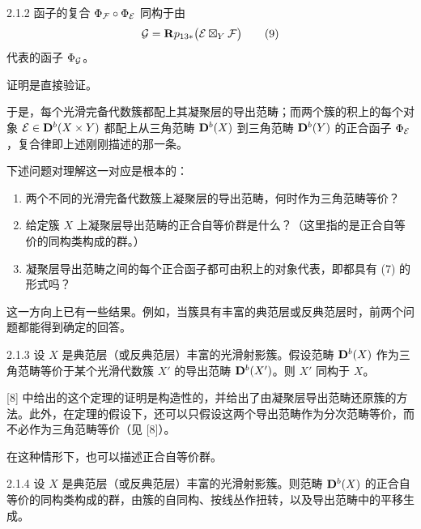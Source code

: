 \begin{proposition}{2.1.2}
函子的复合 $\Phi_{\mathcal{F}}\circ\Phi_{\mathcal{E}}$ 同构于由
\begin{equation}
\mathcal{G}=\mathbf{R} p_{13*}\bigl(\mathcal{E}\boxtimes_Y\mathcal{F}\bigr) \tag{9}
\end{equation}
代表的函子 $\Phi_{\mathcal{G}}$。
\end{proposition}

证明是直接验证。


于是，每个光滑完备代数簇都配上其凝聚层的导出范畴；而两个簇的积上的每个对象 $\mathcal{E}\in\mathbf{D}^{b}(X\times Y)$ 都配上从三角范畴 $\mathbf{D}^{b}(X)$ 到三角范畴 $\mathbf{D}^{b}(Y)$ 的正合函子 $\Phi_{\mathcal{E}}$，复合律即上述刚刚描述的那一条。

下述问题对理解这一对应是根本的：
\begin{enumerate}[label=\arabic*),leftmargin=2.4em,itemsep=1pt,topsep=2pt]
\item 两个不同的光滑完备代数簇上凝聚层的导出范畴，何时作为三角范畴等价？
\item 给定簇 $X$ 上凝聚层导出范畴的正合自等价群是什么？（这里指的是正合自等价的同构类构成的群。）
\item 凝聚层导出范畴之间的每个正合函子都可由积上的对象代表，即都具有 (7) 的形式吗？
\end{enumerate}

这一方向上已有一些结果。例如，当簇具有丰富的典范层或反典范层时，前两个问题都能得到确定的回答。

\begin{theorem}[{见 {[}8{]}}]{2.1.3}
设 $X$ 是典范层（或反典范层）丰富的光滑射影簇。假设范畴 $\mathbf{D}^{b}(X)$ 作为三角范畴等价于某个光滑代数簇 $X'$ 的导出范畴 $\mathbf{D}^{b}(X')$。则 $X'$ 同构于 $X$。
\end{theorem}

[8] 中给出的这个定理的证明是构造性的，并给出了由凝聚层导出范畴还原簇的方法。此外，在定理的假设下，还可以只假设这两个导出范畴作为分次范畴等价，而不必作为三角范畴等价（见 [8]）。

在这种情形下，也可以描述正合自等价群。

\begin{theorem}[{见 {[}8{]}}]{2.1.4}
设 $X$ 是典范层（或反典范层）丰富的光滑射影簇。则范畴 $\mathbf{D}^{b}(X)$ 的正合自等价的同构类构成的群，由簇的自同构、按线丛作扭转，以及导出范畴中的平移生成。
\end{theorem}


